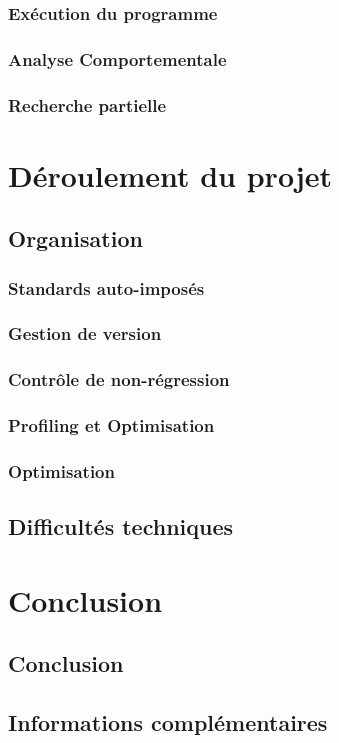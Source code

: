 \documentclass[a4paper,10pt]{report}
\begin{document}
\subsection{Exécution du programme}

\subsection{Analyse Comportementale}

\subsection{Recherche partielle}


\chapter{Déroulement du projet}
\section{Organisation}
\subsection{Standards auto-imposés}

\subsection{Gestion de version}

\subsection{Contrôle de non-régression}

\subsection{Profiling et Optimisation}

\subsection{Optimisation}

\section{Difficultés techniques}

\chapter{Conclusion}
\section{Conclusion}


\section{Informations complémentaires}
\end{document}
